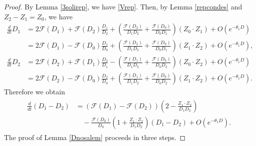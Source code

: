 \documentclass[10pt,a4paper]{amsart}
\begin{document}
\begin{proof}
By Lemma \ref{3solirep}, we have \eqref{Vrep}. Then, by Lemma \ref{repcondes} and $Z_2-Z_1=Z_0$, we have
\begin{align*}
\frac{d}{dt}D_1&=2\mathcal{F}(D_1)+\mathcal{F}(D_2)\frac{D_1}{D_2}+\left( \frac{\mathcal{F}(D_2)}{D_1D_2}+\frac{\mathcal{F}(D_0)}{D_0D_1}\right)(Z_0\cdot Z_1)+O(e^{-\theta_1D})
\\
&=2\mathcal{F}(D_1)-\mathcal{F}(D_0)\frac{D_1}{D_0}+\left(\frac{\mathcal{F}(D_2)}{D_1D_2}+\frac{\mathcal{F}(D_0)}{D_0D_1}\right)(Z_1\cdot Z_2)+O(e^{-\theta_1 D}),
\\
\frac{d}{dt}D_2&=2\mathcal{F}(D_2)+\mathcal{F}(D_1)\frac{D_2}{D_1}-\left(\frac{\mathcal{F}(D_1)}{D_1D_2}+\frac{\mathcal{F}(D_0)}{D_0D_2}\right)(Z_0\cdot Z_2)+O(e^{-\theta_1 D})
\\
&=2\mathcal{F}(D_2)-\mathcal{F}(D_0)\frac{D_2}{D_0}+\left(\frac{\mathcal{F}(D_1)}{D_1D_2}+\frac{\mathcal{F}(D_0)}{D_0D_2}\right)(Z_1\cdot Z_2)+O(e^{-\theta_1 D}).
\end{align*}
Therefore we obtain
\begin{align}\label{d1d2saes}
\begin{aligned}
\frac{d}{dt}(D_1-D_2)&=\left( \mathcal{F}(D_1)-\mathcal{F}(D_2)\right)\left(2-\frac{Z_1\cdot Z_2}{D_1D_2}\right)
\\
&\quad -\frac{\mathcal{F}(D_0)}{D_0}\left(1+\frac{Z_1\cdot Z_2}{D_1D_2}\right)(D_1-D_2)+O(e^{-\theta_1 D}).
\end{aligned}
\end{align}
The proof of Lemma \ref{Dnosalem} proceeds in three steps.


\end{proof}
\end{document}
